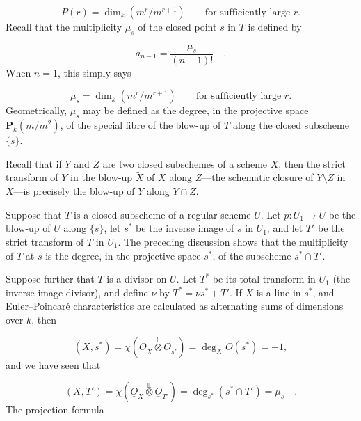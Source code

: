 \begin{equation*}
P(r)=\dim_k(m^r/m^{r+1})\qquad\text{for sufficiently large }r.
\end{equation*}
Recall that the multiplicity $\mu_s$ of the closed point $s$ in $T$ is defined by

\begin{equation*}
a_{n-1}=\frac{\mu_s}{(n-1)!} \quad .
\end{equation*}
When $n=1$, this simply says

\begin{equation*}
\mu_s=\dim_k(m^r/m^{r+1})\qquad\text{for sufficiently large }r.
\end{equation*}
Geometrically, $\mu_s$ may be defined as the degree, in the projective space
$\mathbf P_k(m/m^2)$, of the special fibre of the blow-up of $T$ along the closed
subscheme $\{s\}$.


Recall that if $Y$ and $Z$ are two closed subschemes of a scheme $X$, then the
strict transform of $Y$ in the blow-up $\widetilde X$ of $X$ along $Z$---the
schematic closure of $Y\setminus Z$ in $\widetilde X$---is precisely the blow-up
of $Y$ along $Y\cap Z$.

Suppose that $T$ is a closed subscheme of a regular scheme $U$.  Let
$p:U_1\longrightarrow U$ be the blow-up of $U$ along $\{s\}$, let $s^*$ be the
inverse image of $s$ in $U_1$, and let $T'$ be the strict transform of $T$ in
$U_1$.  The preceding discussion shows that the multiplicity of $T$ at $s$ is
the degree, in the projective space $s^*$, of the subscheme $s^*\cap T'$.

Suppose further that $T$ is a divisor on $U$.  Let $T^*$ be its total transform
in $U_1$ (the inverse-image divisor), and define $\nu$ by
$T^*=\nu s^*+T'$.  If $X$ is a line in $s^*$, and Euler--Poincaré
characteristics are calculated as alternating sums of dimensions over $k$, then

\begin{equation}\tag{2.6.1}
(X,s^*)=
\chi(\underline{O}_X\overset{\mathbb L}{\otimes}\underline{O}_{s^*})
=\deg_X\underline{O}(s^*)=-1,
\end{equation}
and we have seen that

\begin{equation}\tag{2.6.2}
(X,T')=
\chi(\underline{O}_X\overset{\mathbb L}{\otimes}\underline{O}_{T'})
=\deg_{s^*}(s^*\cap T')=\mu_s \quad .
\end{equation}
The projection formula

